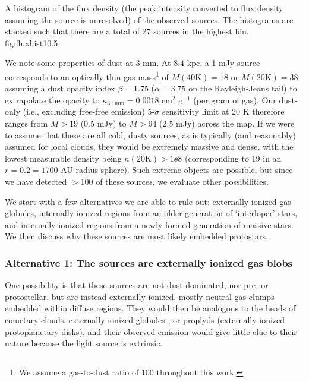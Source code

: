 \documentclass[twocolumn]{aastex61}
\newcommand{\dsgrb}{\ensuremath{8.4\textrm{~kpc}}\xspace}
\begin{document}
{A histogram of the flux density (the peak intensity converted to flux density
assuming the source is unresolved) of the observed sources. 
The histograms are stacked such that there are a total of 27 sources in the
highest bin.
}
{fig:fluxhist}{1}{0.5\textwidth}

We note some properties of dust at 3 mm.   At \dsgrb, a 1 mJy source
corresponds to an optically thin gas mass\footnote{We assume a gas-to-dust
ratio of 100 throughout this work.} of $M(40\mathrm{K})=18$ \msun or
$M(20\mathrm{K})=38$ \msun assuming a dust opacity index $\beta=1.75$
($\alpha=3.75$ on the Rayleigh-Jeans tail) to extrapolate the
\citet[][MRN with thin ice mantles anchored at 1mm]{Ossenkopf1994a} opacity to
$\kappa_{3.1 \mathrm{mm}}=0.0018$ cm$^2$ g$^{-1}$ (per
gram of gas).  Our dust-only (i.e., excluding free-free emission) 5-$\sigma$
sensitivity limit at 20 K therefore ranges from $M>19$ \msun (0.5 mJy) to
$M>94$ \msun (2.5 mJy) across the map.  If we were to assume that these are all
cold, dusty sources, as is typically (and reasonably) assumed for local clouds,
they would be extremely massive and dense, with the lowest measurable density
being $n(20\mathrm{K}) > 1\ee{8}$ \percc (corresponding to 19 \msun in an
$r=0.2$\arcsec$=1700$ AU radius sphere).  Such extreme objects are possible,
but since we have detected $>100$ of these sources, we evaluate other
possibilities.

We start with a few alternatives we are able to rule out: externally
ionized gas globules, internally ionized \hii regions from an older
generation of `interloper' stars, and internally ionized \hii regions
from a newly-formed generation of massive stars.  We then discuss
why these sources are most likely embedded protostars.


\subsubsection{Alternative 1: The sources are externally ionized gas blobs}
\label{sec:alt1}
One possibility is that these sources are not dust-dominated, nor pre- or
protostellar, but are instead externally ionized, mostly neutral gas clumps
embedded within diffuse \hii regions.  They would then be analogous to the
heads of cometary clouds, externally ionized globules
\citep[``EGGs"][]{Sahai2012a}, or proplyds (externally ionized protoplanetary
disks), and their observed emission would give little clue to their nature because
the light source is extrinsic.
\end{document}
